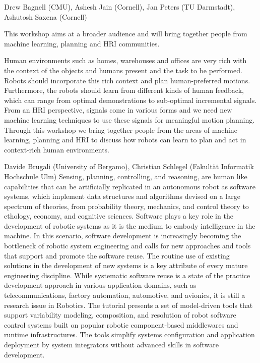 \begin{spacing}{1.0}
{Drew Bagnell (CMU), Ashesh Jain (Cornell), Jan Peters (TU Darmstadt), Ashutosh Saxena (Cornell)}
{
This workshop aims at a broader audience and will bring together people from machine learning, planning and HRI communities.

Human environments such as homes, warehouses and offices are very rich with the context of the objects and humans present and the task to be performed. Robots should incorporate this rich context and plan human-preferred motions. Furthermore, the robots should learn from different kinds of human feedback, which can range from optimal demonstrations to sub-optimal incremental signals. From an HRI perspective, signals come in various forms and we need new machine learning techniques to use these signals for meaningful motion planning. Through this workshop we bring together people from the areas of machine learning, planning and HRI to discuss how robots can learn to plan and act in context-rich human environments.
}

\clearpage
{}
{Davide Brugali (University of Bergamo), Christian Schlegel (Fakultät Informatik Hochschule Ulm)}
{
Sensing, planning, controlling, and reasoning, are human like capabilities that can be artificially replicated in an autonomous robot as software systems, which implement data structures and algorithms devised on a large spectrum of theories, from probability theory, mechanics, and control theory to ethology, economy, and cognitive sciences. Software plays a key role in the development of robotic systems as it is the medium to embody intelligence in the machine. In this scenario, software development is increasingly becoming the bottleneck of robotic system engineering and calls for new approaches and tools that support and promote the software reuse. The routine use of existing solutions in the development of new systems is a key attribute of every mature engineering discipline. While systematic software reuse is a state of the practice development approach in various application domains, such as telecommunications, factory automation, automotive, and avionics, it is still a research issue in Robotics. The tutorial presents a set of model-driven tools that support variability modeling, composition, and resolution of robot software control systems built on popular robotic component-based middlewares and runtime infrastructures. The tools simplify systems configuration and application deployment by system integrators without advanced skills in software development.
}




\end{spacing}
